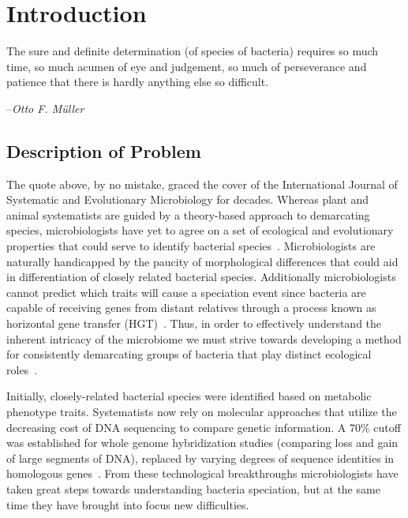 \gobbletocpage
\chapter{Introduction}
\restoretocpage

\begin{shadequote}
The sure and definite determination (of species of bacteria) requires so much time, so much acumen of eye and judgement, so much of perseverance and patience that there is hardly anything else so \mbox{difficult}. \par--\emph{Otto F. M\"uller}
\end{shadequote}

\section{Description of Problem}
The quote above, by no mistake, graced the cover of the International Journal of Systematic and Evolutionary Microbiology for decades.
Whereas plant and animal systematists are guided by a theory-based approach to demarcating species, microbiologists have yet to agree on a set of ecological and evolutionary properties that could serve to identify bacterial species~\cite{cohan2007systematics}.
Microbiologists are naturally handicapped by the paucity of morphological differences that could aid in differentiation of closely related bacterial species.
Additionally microbiologists cannot predict which traits will cause a speciation event since bacteria are capable of receiving genes from distant relatives through a process known as horizontal gene transfer (HGT)~\cite{cohan2007systematics}.
Thus, in order to effectively understand the inherent intricacy of the microbiome we must strive towards developing a method for consistently demarcating groups of bacteria that play distinct ecological roles~\cite{koeppel2008identifying}.

Initially, closely-related bacterial species were identified based on metabolic phenotype traits.
Systematists now rely on molecular approaches that utilize the decreasing cost of DNA sequencing to compare genetic information.
A 70\% cutoff was established for whole genome hybridization studies (comparing loss and gain of large segments of DNA), replaced by varying degrees of sequence identities in homologous genes~\cite{cohan2007systematics,carlo,staley1997biodiversity}.
From these technological breakthroughs microbiologists have taken great steps towards understanding bacteria speciation, but at the same time they have brought into focus new difficulties.

